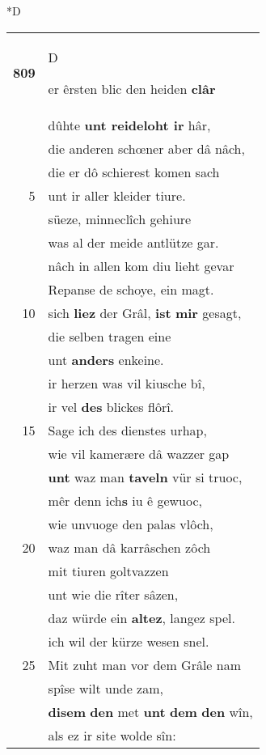 \documentclass[8pt,a4paper,notitlepage]{article}
\begin{document}
\begin{table}[ht]
\begin{minipage}[t]{0.5\linewidth}
\small
\begin{center}*D
\end{center}
\begin{tabular}{rl}
\textbf{809} & \begin{large}D\end{large}er êrsten blic den heiden \textbf{clâr}\\ 
 & dûhte \textbf{unt reideloht ir} hâr,\\ 
 & die anderen schœner aber dâ nâch,\\ 
 & die er dô schierest komen sach\\ 
5 & unt ir aller kleider tiure.\\ 
 & süeze, minneclîch gehiure\\ 
 & was al der meide antlütze gar.\\ 
 & nâch in allen kom diu lieht gevar\\ 
 & Repanse de schoye, ein magt.\\ 
10 & sich \textbf{liez} der Grâl, \textbf{ist} \textbf{mir} gesagt,\\ 
 & die selben tragen eine\\ 
 & unt \textbf{anders} enkeine.\\ 
 & ir herzen was vil kiusche bî,\\ 
 & ir vel \textbf{des} blickes flôrî.\\ 
15 & Sage ich des dienstes urhap,\\ 
 & wie vil kamerære dâ wazzer gap\\ 
 & \textbf{unt} waz man \textbf{taveln} vür si truoc,\\ 
 & mêr denn ich\textbf{s} iu ê gewuoc,\\ 
 & wie unvuoge den palas vlôch,\\ 
20 & waz man dâ karrâschen zôch\\ 
 & mit tiuren goltvazzen\\ 
 & unt wie die rîter sâzen,\\ 
 & daz würde ein \textbf{altez}, langez spel.\\ 
 & ich wil der kürze wesen snel.\\ 
25 & Mit zuht man vor dem Grâle nam\\ 
 & spîse wilt unde zam,\\ 
 & \textbf{disem} \textbf{den} met \textbf{unt} \textbf{dem} \textbf{den} wîn,\\ 
 & als ez ir site wolde sîn:\\ 

\end{tabular}
\end{minipage}
\end{table}
\end{document}
